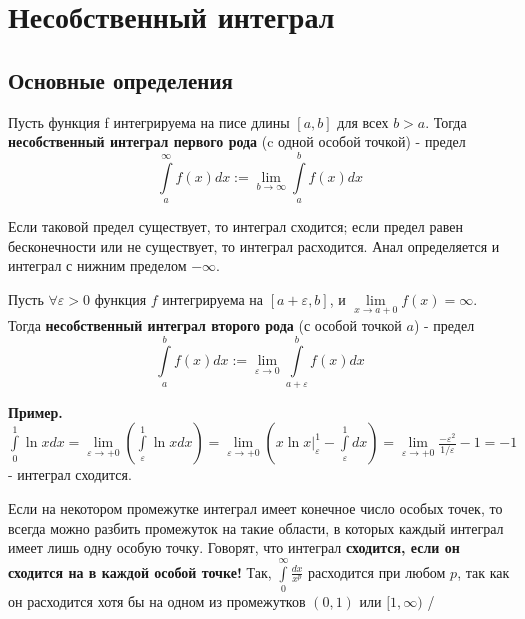\chapter{Несобственный интеграл}
\section{Основные определения}
\begin{defin}
Пусть функция f интегрируема на писе длины $[a,b]$ для всех  $b>a$. 
Тогда \textbf{несобственный интеграл первого рода} (c одной особой точкой)
- предел 
$$\int\limits_{a}^{\infty}f(x)dx:=\lim\limits_{b\to\infty}\int\limits_{a}^{b}
f(x)dx$$
\end{defin}
Если таковой предел существует, то интеграл сходится; если предел равен 
бесконечности или не существует, то интеграл расходится. Анал
определяется и интеграл с нижним пределом $-\infty$.
\begin{defin}
    Пусть $\forall \varepsilon>0$ функция $f$ интегрируема на $[a+\varepsilon,
    b]$, и $\lim\limits_{x \to a+0} f(x)=\infty$. Тогда \textbf{несобственный
    интеграл второго рода} (с особой точкой $a$) - предел 
    $$\int\limits_{a}^{b} f(x)dx:=\lim\limits_{\varepsilon \to 0} 
    \int\limits_{a+\varepsilon}^{b} f(x)dx$$
\end{defin}

\textbf{Пример.} $\int\limits_{0}^{1} \ln xdx=\lim\limits_{\varepsilon \to 
+0} \left( \int\limits_{\varepsilon}^{1}\ln xdx\right)=
\lim\limits_{\varepsilon \to +0}\left( x\ln x\big|_\varepsilon^1-
\int\limits_{\varepsilon}^1dx  \right)=\lim\limits_{\varepsilon \to +0}
\frac{-\varepsilon^2}{1 /\varepsilon}-1=-1$ - интеграл сходится.

Если на некотором промежутке интеграл имеет конечное число особых точек, то 
всегда можно разбить промежуток на такие области, в которых каждый интеграл 
имеет лишь одну особую точку. Говорят, что интеграл \textbf{сходится, 
если он сходится на в каждой особой точке!} Так,
$\int\limits_{0}^{\infty} \frac{dx}{x^p}$ расходится при любом $p$, так 
как он расходится хотя бы на одном из промежутков  $(0,1)$ или
$[1,\infty)$ /


